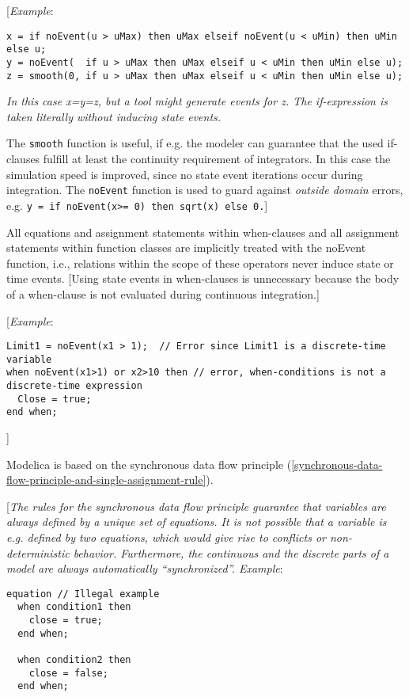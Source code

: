 {[}\emph{Example}:
\begin{lstlisting}[language=modelica]
x = if noEvent(u > uMax) then uMax elseif noEvent(u < uMin) then uMin else u;
y = noEvent(  if u > uMax then uMax elseif u < uMin then uMin else u);
z = smooth(0, if u > uMax then uMax elseif u < uMin then uMin else u);
\end{lstlisting}

\emph{In this case x=y=z, but a tool might generate events for z. The
if-expression is taken literally without inducing state events.}

The \lstinline!smooth! function is useful, if e.g. the modeler can guarantee that
the used if-clauses fulfill at least the continuity requirement of
integrators. In this case the simulation speed is improved, since no
state event iterations occur during integration. The \lstinline!noEvent! function is
used to guard against \emph{outside domain} errors, e.g. \lstinline!y = if noEvent(x>= 0) then sqrt(x) else 0.!{]}

All equations and assignment statements within when-clauses and all
assignment statements within function classes are implicitly treated
with the noEvent function, i.e., relations within the scope of these
operators never induce state or time events. {[}Using state events in
when-clauses is unnecessary because the body of a when-clause is not
evaluated during continuous integration.{]}

{[}\emph{Example}:
\begin{lstlisting}[language=modelica]
Limit1 = noEvent(x1 > 1);  // Error since Limit1 is a discrete-time variable
when noEvent(x1>1) or x2>10 then // error, when-conditions is not a discrete-time expression
  Close = true;
end when;
\end{lstlisting}

{]}

Modelica is based on the synchronous data flow principle (\autoref{synchronous-data-flow-principle-and-single-assignment-rule}).

{[}\emph{The rules for the synchronous data flow principle guarantee
that variables are always defined by a unique set of equations. It is
not possible that a variable is e.g. defined by two equations, which
would give rise to conflicts or non-deterministic behavior. Furthermore,
the continuous and the discrete parts of a model are always
automatically ``synchronized''. Example}:

\begin{lstlisting}[language=modelica]
equation // Illegal example
  when condition1 then
    close = true;
  end when;

  when condition2 then
    close = false;
  end when;
\end{lstlisting}

